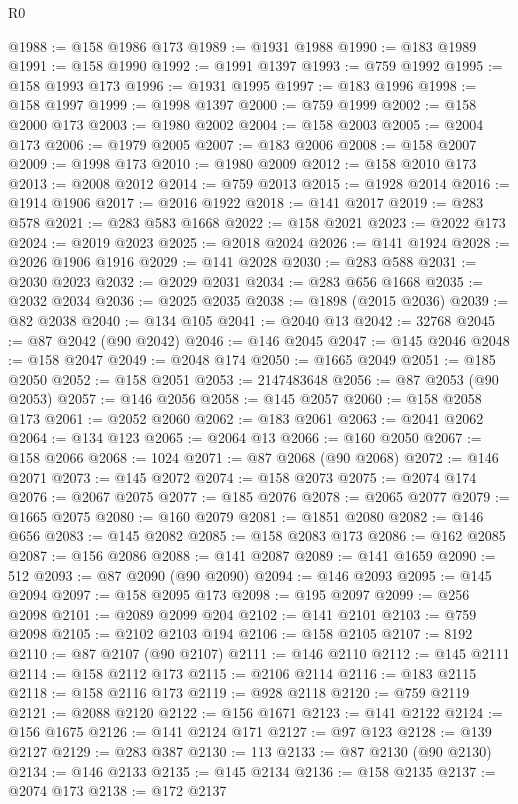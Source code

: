 \begin{lexlean}{R0}
\begin{coremodule}
@1988 := @158 @1986 @173
@1989 := @1931 @1988
@1990 := @183 @1989
@1991 := @158 @1990
@1992 := @1991 @1397
@1993 := @759 @1992
@1995 := @158 @1993 @173
@1996 := @1931 @1995
@1997 := @183 @1996
@1998 := @158 @1997
@1999 := @1998 @1397
@2000 := @759 @1999
@2002 := @158 @2000 @173
@2003 := @1980 @2002
@2004 := @158 @2003
@2005 := @2004 @173
@2006 := @1979 @2005
@2007 := @183 @2006
@2008 := @158 @2007
@2009 := @1998 @173
@2010 := @1980 @2009
@2012 := @158 @2010 @173
@2013 := @2008 @2012
@2014 := @759 @2013
@2015 := @1928 @2014
@2016 := @1914 @1906
@2017 := @2016 @1922
@2018 := @141 @2017
@2019 := @283 @578
@2021 := @283 @583 @1668
@2022 := @158 @2021
@2023 := @2022 @173
@2024 := @2019 @2023
@2025 := @2018 @2024
@2026 := @141 @1924
@2028 := @2026 @1906 @1916
@2029 := @141 @2028
@2030 := @283 @588
@2031 := @2030 @2023
@2032 := @2029 @2031
@2034 := @283 @656 @1668
@2035 := @2032 @2034
@2036 := @2025 @2035
@2038 := @1898 (@2015 @2036)
@2039 := @82 @2038
@2040 := @134 @105
@2041 := @2040 @13
@2042 := 32768
@2045 := @87 @2042 (@90 @2042)
@2046 := @146 @2045
@2047 := @145 @2046
@2048 := @158 @2047
@2049 := @2048 @174
@2050 := @1665 @2049
@2051 := @185 @2050
@2052 := @158 @2051
@2053 := 2147483648
@2056 := @87 @2053 (@90 @2053)
@2057 := @146 @2056
@2058 := @145 @2057
@2060 := @158 @2058 @173
@2061 := @2052 @2060
@2062 := @183 @2061
@2063 := @2041 @2062
@2064 := @134 @123
@2065 := @2064 @13
@2066 := @160 @2050
@2067 := @158 @2066
@2068 := 1024
@2071 := @87 @2068 (@90 @2068)
@2072 := @146 @2071
@2073 := @145 @2072
@2074 := @158 @2073
@2075 := @2074 @174
@2076 := @2067 @2075
@2077 := @185 @2076
@2078 := @2065 @2077
@2079 := @1665 @2075
@2080 := @160 @2079
@2081 := @1851 @2080
@2082 := @146 @656
@2083 := @145 @2082
@2085 := @158 @2083 @173
@2086 := @162 @2085
@2087 := @156 @2086
@2088 := @141 @2087
@2089 := @141 @1659
@2090 := 512
@2093 := @87 @2090 (@90 @2090)
@2094 := @146 @2093
@2095 := @145 @2094
@2097 := @158 @2095 @173
@2098 := @195 @2097
@2099 := @256 @2098
@2101 := @2089 @2099 @204
@2102 := @141 @2101
@2103 := @759 @2098
@2105 := @2102 @2103 @194
@2106 := @158 @2105
@2107 := 8192
@2110 := @87 @2107 (@90 @2107)
@2111 := @146 @2110
@2112 := @145 @2111
@2114 := @158 @2112 @173
@2115 := @2106 @2114
@2116 := @183 @2115
@2118 := @158 @2116 @173
@2119 := @928 @2118
@2120 := @759 @2119
@2121 := @2088 @2120
@2122 := @156 @1671
@2123 := @141 @2122
@2124 := @156 @1675
@2126 := @141 @2124 @171
@2127 := @97 @123
@2128 := @139 @2127
@2129 := @283 @387
@2130 := 113
@2133 := @87 @2130 (@90 @2130)
@2134 := @146 @2133
@2135 := @145 @2134
@2136 := @158 @2135
@2137 := @2074 @173
@2138 := @172 @2137

\end{coremodule}
\end{lexlean}

